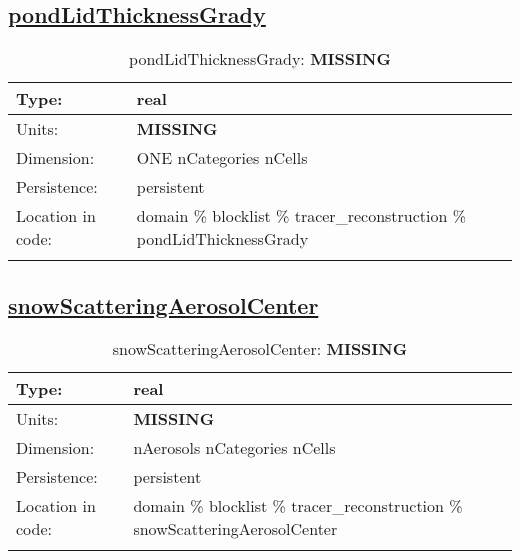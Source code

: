 \subsection[pondLidThicknessGrady]{\hyperref[sec:var_tab_tracer_reconstruction]{pondLidThicknessGrady}}
\label{subsec:var_sec_tracer_reconstruction_pondLidThicknessGrady}
\begin{center}
\begin{longtable}{| p{2.0in} | p{4.0in} |}
        \hline 
        Type: & real \\
        \hline 
        Units: & {\bf \color{red} MISSING} \\
        \hline 
        Dimension: & ONE nCategories nCells \\
        \hline 
        Persistence: & persistent \\
        \hline 
         Location in code: & domain \% blocklist \% tracer\_reconstruction \% pondLidThicknessGrady \\
         \hline 
    \caption{pondLidThicknessGrady: {\bf \color{red} MISSING}}
\end{longtable}
\end{center}
\subsection[snowScatteringAerosolCenter]{\hyperref[sec:var_tab_tracer_reconstruction]{snowScatteringAerosolCenter}}
\label{subsec:var_sec_tracer_reconstruction_snowScatteringAerosolCenter}
\begin{center}
\begin{longtable}{| p{2.0in} | p{4.0in} |}
        \hline 
        Type: & real \\
        \hline 
        Units: & {\bf \color{red} MISSING} \\
        \hline 
        Dimension: & nAerosols nCategories nCells \\
        \hline 
        Persistence: & persistent \\
        \hline 
         Location in code: & domain \% blocklist \% tracer\_reconstruction \% snowScatteringAerosolCenter \\
         \hline 
    \caption{snowScatteringAerosolCenter: {\bf \color{red} MISSING}}
\end{longtable}
\end{center}
